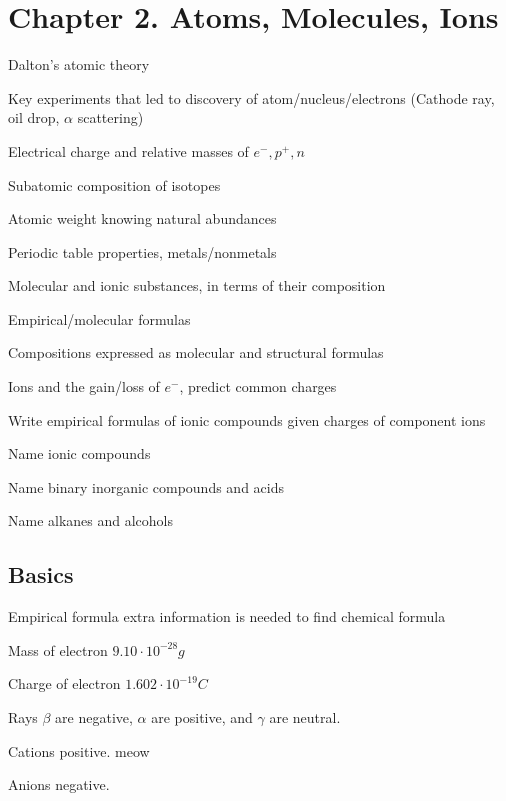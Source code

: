 \section{Chapter 2. Atoms, Molecules, Ions}

\secttoc

{\footnotesize
\begin{multicols}{3}
\begin{compactenum}
    \item Dalton's atomic theory
    \item Key experiments that led to discovery of atom/nucleus/electrons
        (Cathode ray, oil drop, $\alpha$ scattering)
    \item Electrical charge and relative masses of $e^-, p^+, n$
    \item Subatomic composition of isotopes
    \item Atomic weight knowing natural abundances
    \item Periodic table properties, metals/nonmetals
    \item Molecular and ionic substances, in terms of their composition
    \item Empirical/molecular formulas
    \item Compositions expressed as molecular and structural formulas
    \item Ions and the gain/loss of $e^-$, predict common charges
    \item Write empirical formulas of ionic compounds given charges of component ions
    \item Name ionic compounds
    \item Name binary inorganic compounds and acids
    \item Name alkanes and alcohols
\end{compactenum}
\end{multicols}
}
\begin{mdframed}
\begin{multicols}{3}
\subsection{Basics}
\begin{compactdesc}
\item[Empirical formula] extra information is needed to find chemical formula
\item[Mass of electron] $9.10 \cdot 10^{-28}g$
\item[Charge of electron] $1.602 \cdot 10^{-19}C$
\item[Rays] $\beta$ are negative, $\alpha$ are positive, and $\gamma$ are
    neutral.
\item[Cations] positive. meow
\item[Anions] negative.
\end{compactdesc}
\end{multicols}
\end{mdframed}








